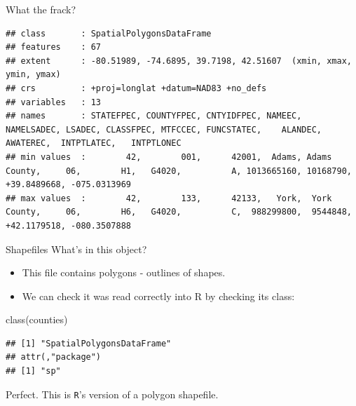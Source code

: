 \documentclass[
  ignorenonframetext,
]{beamer}
\newenvironment{Shaded}{\begin{snugshade}}{\end{snugshade}}
\newcommand{\FunctionTok}[1]{\textcolor[rgb]{0.00,0.00,0.00}{#1}}
\newcommand{\NormalTok}[1]{#1}
\begin{document}
\begin{frame}[fragile]{What the frack?}
\begin{verbatim}
## class       : SpatialPolygonsDataFrame 
## features    : 67 
## extent      : -80.51989, -74.6895, 39.7198, 42.51607  (xmin, xmax, ymin, ymax)
## crs         : +proj=longlat +datum=NAD83 +no_defs 
## variables   : 13
## names       : STATEFPEC, COUNTYFPEC, CNTYIDFPEC, NAMEEC,   NAMELSADEC, LSADEC, CLASSFPEC, MTFCCEC, FUNCSTATEC,    ALANDEC, AWATEREC,  INTPTLATEC,   INTPTLONEC 
## min values  :        42,        001,      42001,  Adams, Adams County,     06,        H1,   G4020,          A, 1013665160, 10168790, +39.8489668, -075.0313969 
## max values  :        42,        133,      42133,   York,  York County,     06,        H6,   G4020,          C,  988299800,  9544848, +42.1179518, -080.3507888
\end{verbatim}
\end{frame}

\begin{frame}[fragile]{Shapefiles}
\protect\hypertarget{shapefiles}{}
What's in this object?

\begin{itemize}
\item
  This file contains polygons - outlines of shapes.
\item
  We can check it was read correctly into R by checking its class:
\end{itemize}

\begin{Shaded}
\begin{Highlighting}[]
\FunctionTok{class}\NormalTok{(counties)}
\end{Highlighting}
\end{Shaded}

\begin{verbatim}
## [1] "SpatialPolygonsDataFrame"
## attr(,"package")
## [1] "sp"
\end{verbatim}

Perfect. This is \texttt{R}'s version of a polygon shapefile.
\end{frame}
\end{document}

